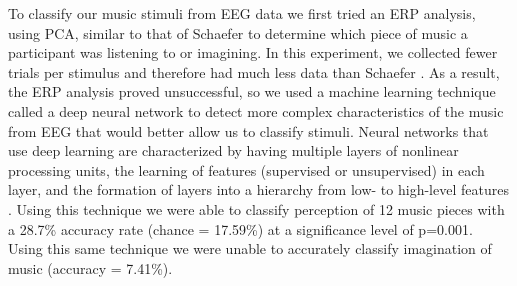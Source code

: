 To classify our music stimuli from EEG data we first tried an ERP analysis, using \ac{PCA}, similar to that of Schaefer \etal\citeyear{schaefer_name_2011} to determine which piece of music a participant was listening to or imagining.
In this experiment, we collected fewer trials per stimulus and therefore had much less data than Schaefer \etal\citeyear{schaefer_name_2011}. 
As a result, the ERP analysis proved unsuccessful, so we used a machine learning technique called a deep neural network to detect more complex characteristics of the music from EEG that would better allow us to classify stimuli.
Neural networks that use deep learning are characterized by having multiple layers of nonlinear processing units, the learning of features (supervised or unsupervised) in each layer, and the formation of layers into a hierarchy from low- to high-level features \cite{deng2014deep}. 
Using this technique we were able to classify perception of 12 music pieces with a 28.7\% accuracy rate (chance = 17.59\%) at a significance level of p=0.001.
Using this same technique we were unable to accurately classify imagination of music (accuracy = 7.41\%). 